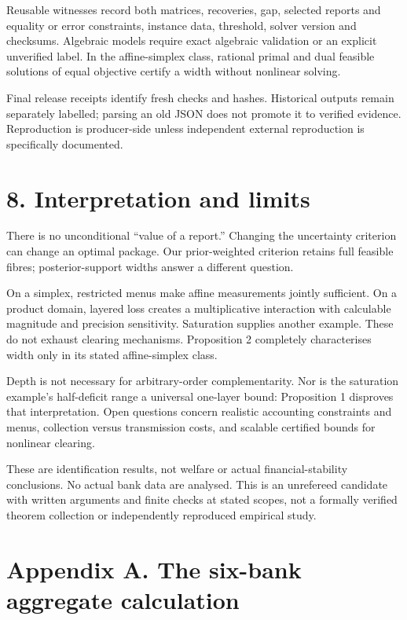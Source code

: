 \documentclass[
  british,
  11pt,
  a4paper,
]{article}
\begin{document}
Reusable witnesses record both matrices, recoveries, gap, selected
reports and equality or error constraints, instance data, threshold,
solver version and checksums. Algebraic models require exact algebraic
validation or an explicit unverified label. In the affine-simplex class,
rational primal and dual feasible solutions of equal objective certify a
width without nonlinear solving.

Final release receipts identify fresh checks and hashes. Historical
outputs remain separately labelled; parsing an old JSON does not promote
it to verified evidence. Reproduction is producer-side unless
independent external reproduction is specifically documented.

\section{8. Interpretation and limits}\label{interpretation-and-limits}

There is no unconditional ``value of a report.'' Changing the
uncertainty criterion can change an optimal package. Our prior-weighted
criterion retains full feasible fibres; posterior-support widths answer
a different question.

On a simplex, restricted menus make affine measurements jointly
sufficient. On a product domain, layered loss creates a multiplicative
interaction with calculable magnitude and precision sensitivity.
Saturation supplies another example. These do not exhaust clearing
mechanisms. Proposition 2 completely characterises width only in its
stated affine-simplex class.

Depth is not necessary for arbitrary-order complementarity. Nor is the
saturation example's half-deficit range a universal one-layer bound:
Proposition 1 disproves that interpretation. Open questions concern
realistic accounting constraints and menus, collection versus
transmission costs, and scalable certified bounds for nonlinear
clearing.

These are identification results, not welfare or actual
financial-stability conclusions. No actual bank data are analysed. This
is an unrefereed candidate with written arguments and finite checks at
stated scopes, not a formally verified theorem collection or
independently reproduced empirical study.

\section{Appendix A. The six-bank aggregate
calculation}\label{appendix-a.-the-six-bank-aggregate-calculation}
\end{document}
